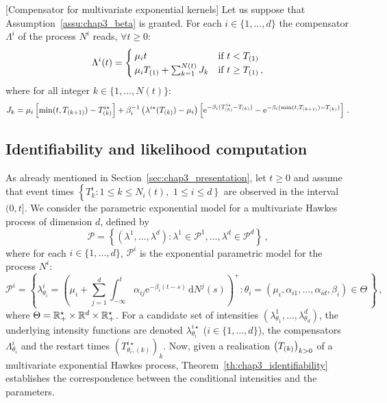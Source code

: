     \begin{proposition}\label{prop:chap3_compensator}[Compensator for multivariate exponential kernels]
    Let us suppose that Assumption~\ref{assu:chap3_beta} is granted. For each $i\in\{1,\ldots, d\}$ the compensator $\Lambda^i$ of the process $N^i$ reads, $\forall t\geq 0$:
    \begin{equation}\label{eq:chap3_compensator_exponential}
      \Lambda^i(t) =
      \begin{cases}
        \mu_i t & \text{if } t < T\park[1] \\
        \mu_i T\park[1] + \sum_{k=1}^{N(t)} J_k & \text{if } t \geq T\park[1] \,,
      \end{cases}
    \end{equation}
    where for all integer \(k \in \{1, \dots, N(t)\}\):
    \begin{equation*}
      J_k =
      \mu_i \left[\min(t, T\park[k+1] ) - T\park^{i\star}\right] + \beta_i^{-1} \left(\lambda^{i\star}(T\park) - \mu_i \right)
      \left[ \mathrm{e}^{-\beta_i(T\park^{i\star} - T\park)} - \mathrm{e}^{-\beta_i(\min(t, T\park[k+1])- T\park)} \right]\,.
    \end{equation*}
    \end{proposition}
    
  \subsection{Identifiability and likelihood computation}\label{sec:chap3_likelihood}
    As already mentioned in Section~\ref{sec:chap3_presentation}, let \(t \ge 0\) and assume that event times
    $\left\{ T_k^i : 1 \le k \le N_i(t),\right.$ $\left. 1 \le i \le d \right\}$ are observed in the interval \((0, t]\).
    We consider the parametric exponential model for a multivariate Hawkes process of dimension $d$, defined by
    \[
      \mathcal P = \left\{(\lambda^1, \dots, \lambda^d)\colon \lambda^1 \in \mathcal P^1, \dots, \lambda^d \in \mathcal P^d \right\} \,,
    \]
    where for each \(i \in \{1, \dots, d\}\), \(\mathcal P^i\) is the exponential parametric model for the process \(N^i\):
\[
      \mathcal{P}^i
      = \left\{	\lambda_{\theta_i}^i = \left(\mu_i + \sum_{j=1}^{d}{\int_{-\infty}^{t}{\alpha_{ij} \mathrm{e}^{-\beta_i(t-s)}\,\mathrm{d}N^j(s)}}\right)^+ \colon \theta_i = (\mu_i, \alpha_{i1}, \ldots, \alpha_{id}, \beta_i) \in\Theta \,\right\}\,,
    \]
    where $\Theta = \RR_+^\star\times\RR^d\times\RR_+^\star$.
    For a candidate set of intensities \((\lambda_{\theta_1}^1, \dots, \lambda_{\theta_d}^d)\), the underlying intensity functions are denoted \(\lambda_{\theta_i}^{i\star}\) (\(i \in \{1, \dots, d\}\)), the compensators $\Lambda_{\theta_i}^i$
    and the restart times
    $(T^{i\star}_{\theta_i, (k)})_{k}$.
    Now, given a realisation $\left(T\park \right)_{k>0}$ of a multivariate exponential Hawkes process,
    Theorem~\ref{th:chap3_identifiability} establishes the correspondence between the conditional intensities and the parameters.
        
